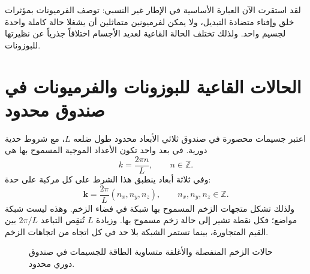 \begin{classroomqa}
\end{classroomqa}

لقد استقرت الآن العبارة الأساسية في الإطار غير النسبي: توصف الفرميونات بمؤثرات خلق وإفناء متضادة التبديل، ولا يمكن لفرميونين متماثلين أن يشغلا حالة كاملة واحدة لجسيم واحد. ولذلك تختلف الحالة القاعية لعديد الأجسام اختلافاً جذرياً عن نظيرتها للبوزونات.

\section{الحالات القاعية للبوزونات والفرميونات في صندوق محدود}

اعتبر جسيمات محصورة في صندوق ثلاثي الأبعاد محدود طول ضلعه \(L\)، مع شروط حدية دورية. في بعد واحد تكون الأعداد الموجية المسموح بها هي
\begin{equation}
k=\frac{2\pi n}{L},
\qquad n\in\mathbb{Z}.
\end{equation}
وفي ثلاثة أبعاد ينطبق هذا الشرط على كل مركبة على حدة:
\begin{equation}
\mathbf{k}=\frac{2\pi}{L}(n_x,n_y,n_z),
\qquad n_x,n_y,n_z\in\mathbb{Z}.
\end{equation}
ولذلك تشكل متجهات الزخم المسموح بها شبكة في فضاء الزخم. وهذه ليست شبكة مواضع؛ فكل نقطة تشير إلى حالة زخم مسموح بها. وزيادة \(L\) تُنقِص التباعد \(2\pi/L\) بين القيم المتجاورة، بينما تستمر الشبكة بلا حد في كل اتجاه من اتجاهات الزخم.

\begin{figure}
\centering
{}
\caption{حالات الزخم المنفصلة والأغلفة متساوية الطاقة للجسيمات في صندوق دوري محدود.}
\end{figure}

